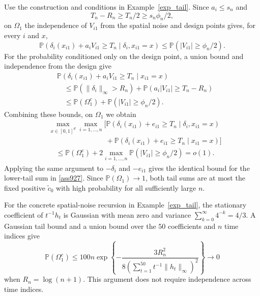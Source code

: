 \documentclass[twoside,11pt]{article}
\newenvironment{revision}{\color{revisionred}}{}
\begin{document}
\begin{revision}
\begin{example}
\label{ass_5_exp}
Use the construction and conditions in Example~\ref{exp_tail}. Since $a_i\leq s_n$ and
\[
T_n-R_n\geq T_n/2\geq s_n\phi_n/2,
\]
on $\Omega_1$ the independence of $V_{i1}$ from the spatial noise and design points gives, for every $i$ and $x$,
\[
\mathbb{P}\left(\delta_i(x_{i1})+a_iV_{i1}\geq T_n
\mid\delta_i,x_{i1}=x\right)
\leq\mathbb{P}(|V_{i1}|\geq\phi_n/2).
\]
For the probability conditioned only on the design point, a union bound and independence from the design give
\begin{align*}
&\mathbb{P}\left(\delta_i(x_{i1})+a_iV_{i1}\geq T_n
\mid x_{i1}=x\right)\\
&\quad\leq
\mathbb{P}(\|\delta_i\|_\infty>R_n)
+\mathbb{P}(a_i|V_{i1}|\geq T_n-R_n)\\
&\quad\leq
\mathbb{P}(\Omega_1^c)+\mathbb{P}(|V_{i1}|\geq\phi_n/2).
\end{align*}
Combining these bounds, on $\Omega_1$ we obtain
\begin{equation}
\label{in963}
\begin{aligned}
&\max_{x\in[0,1]^d}\max_{i=1,\dots,n}
\bigg[
\mathbb{P}\left(\delta_i(x_{i1})+e_{i1}\geq T_n
\mid\delta_i,x_{i1}=x\right)\\
&\qquad\qquad\qquad\qquad
+\mathbb{P}\left(\delta_i(x_{i1})+e_{i1}\geq T_n
\mid x_{i1}=x\right)
\bigg]\\
&\quad\leq
\mathbb{P}(\Omega_1^c)
+2\max_{i=1,\dots,n}\mathbb{P}(|V_{i1}|\geq\phi_n/2)
=o(1).
\end{aligned}
\end{equation}
Applying the same argument to $-\delta_i$ and $-e_{i1}$ gives the identical bound for the lower-tail sum in \eqref{ass927}. Since $\mathbb{P}(\Omega_1)\to1$, both tail sums are at most the fixed positive $\tilde c_0$ with high probability for all sufficiently large $n$.

For the concrete spatial-noise recursion in Example~\ref{exp_tail}, the stationary coefficient of $t^{-1}h_t$ is Gaussian with mean zero and variance $\sum_{k=0}^{\infty}4^{-k}=4/3$. A Gaussian tail bound and a union bound over the $50$ coefficients and $n$ time indices give
\[
\mathbb{P}(\Omega_1^c)
\leq 100n\exp\left\{
-\frac{3R_n^2}{8\left(\sum_{t=1}^{50}t^{-1}\|h_t\|_\infty\right)^2}
\right\}\to0
\]
when $R_n=\log(n+1)$. This argument does not require independence across time indices.
\end{example}
\end{revision}
\end{document}
